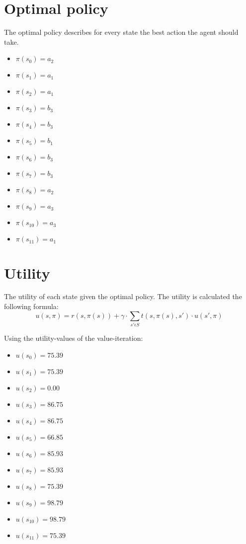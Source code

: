 \documentclass[a4paper]{article}
\begin{document}
\section{Optimal policy}
The optimal policy describes for every state the best action the agent should take.

\begin{multicols}{2}
\begin{itemize}
\item $\pi(s_{0}) = a_{2}$
\item $\pi(s_{1}) = a_{1}$
\item $\pi(s_{2}) = a_{1}$
\item $\pi(s_{3}) = b_{3}$
\item $\pi(s_{4}) = b_{3}$
\item $\pi(s_{5}) = b_{1}$
\item $\pi(s_{6}) = b_{3}$
\item $\pi(s_{7}) = b_{3}$
\item $\pi(s_{8}) = a_{2}$
\item $\pi(s_{9}) = a_{3}$
\item $\pi(s_{10}) = a_{3}$
\item $\pi(s_{11}) = a_{1}$
\end{itemize}
\end{multicols}

\section{Utility}
The utility of each state given the optimal policy. The utility is calculated the following formula:
\begin{equation}
u(s,\pi) = r(s,\pi(s)) + \gamma \cdot \sum_{s' \epsilon S} t(s,\pi(s),s') \cdot u(s',\pi)
\end{equation}

\newpage
Using the utility-values of the value-iteration:
\begin{multicols}{2}
\begin{itemize}
\item $u(s_0) = 75.39 $
\item $u(s_1) = 75.39 $
\item $u(s_2) = 0.00 $
\item $u(s_3) = 86.75 $
\item $u(s_4) = 86.75 $
\item $u(s_5) = 66.85 $
\item $u(s_6) = 85.93 $
\item $u(s_7) = 85.93 $
\item $u(s_8) = 75.39 $
\item $u(s_9) = 98.79 $
\item $u(s_{10}) = 98.79 $
\item $u(s_{11}) = 75.39 $
\end{itemize}
\end{multicols}
\end{document}
